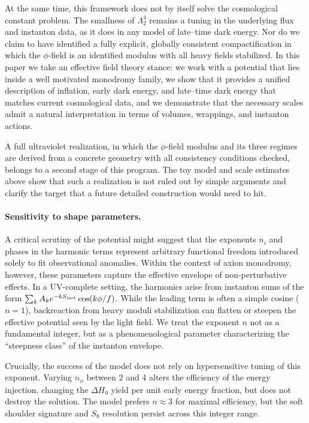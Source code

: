 \documentclass[a4paper,11pt]{article}
\begin{document}
At the same time, this framework does not by itself solve the cosmological constant problem. The smallness of $\Lambda_2^4$ remains a tuning in the underlying flux and instanton data, as it does in any model of late–time dark energy. Nor do we claim to have identified a fully explicit, globally consistent compactification in which the $\phi$-field is an identified modulus with all heavy fields stabilized. In this paper we take an effective field theory stance: we work with a potential that lies inside a well motivated monodromy family, we show that it provides a unified description of inflation, early dark energy, and late–time dark energy that matches current cosmological data, and we demonstrate that the necessary scales admit a natural interpretation in terms of volumes, wrappings, and instanton actions.

A full ultraviolet realization, in which the $\phi$-field modulus and its three regimes are derived from a concrete geometry with all consistency conditions checked, belongs to a second stage of this program. The toy model and scale estimates above show that such a realization is not ruled out by simple arguments and clarify the target that a future detailed construction would need to hit.

\paragraph{Sensitivity to shape parameters.}
A critical scrutiny of the potential might suggest that the exponents $n_i$ and phases in the harmonic terms represent arbitrary functional freedom introduced solely to fit observational anomalies. Within the context of axion monodromy, however, these parameters capture the effective envelope of non-perturbative effects. In a UV-complete setting, the harmonics arise from instanton sums of the form $\sum_k A_k e^{-k S_{\rm inst}} \cos(k\phi/f)$. While the leading term is often a simple cosine ($n=1$), backreaction from heavy moduli stabilization can flatten or steepen the effective potential seen by the light field. We treat the exponent $n$ not as a fundamental integer, but as a phenomenological parameter characterizing the ``steepness class'' of the instanton envelope.

Crucially, the success of the model does not rely on hypersensitive tuning of this exponent. Varying $n_\phi$ between 2 and 4 alters the efficiency of the energy injection, changing the $\Delta H_0$ yield per unit early energy fraction, but does not destroy the solution. The model prefers $n \approx 3$ for maximal efficiency, but the soft shoulder signature and $S_8$ resolution persist across this integer range.
\end{document}
